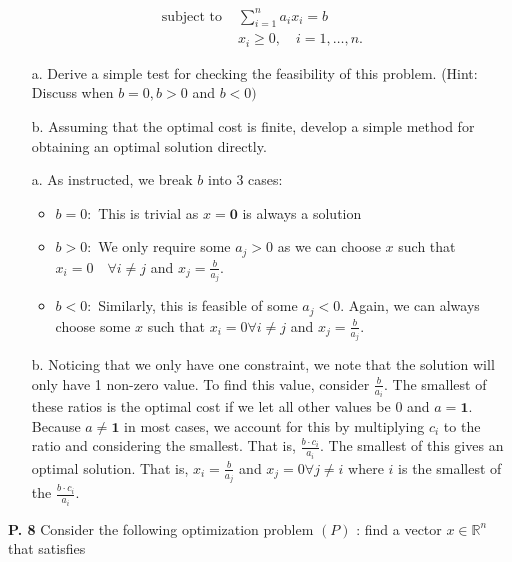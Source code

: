\documentclass{article}
\begin{document}
\begin{jacklist}
\begin{framed}
\[\begin{aligned}
            \text { subject to } & \sum_{i=1}^{n} a_{i} x_{i}=b \\
            & x_{i} \geq 0, \quad i=1, \ldots, n .
        \end{aligned}
    \] 
    \begin{itemize}
        \item [a.] Derive a simple test for checking the feasibility of this problem. (Hint: Discuss when $b=0, b>0$ and $b<0)$ 
        \item [b.] Assuming that the optimal cost is finite, develop a simple method for obtaining an optimal solution directly.
    \end{itemize}
    \end{framed}
    \begin{itemize}
        \item [a.] As instructed, we break $b$ into 3 cases: \\
            \begin{itemize}
                \item $b = 0:$ This is trivial as $x = \textbf{0}$ is always a solution 
                \item $b > 0:$ We only require some $a_j > 0$ as we can choose $x$ such that $x_i = 0 \quad \forall i \neq j$ and 
                    $x_j = \frac{b}{a_j}$. 
                \item $b < 0:$ Similarly, this is feasible of some $a_j < 0$. Again, we can always choose some $x$ such that
                    $x_i = 0 \forall i \neq j$ and $x_j = \frac{b}{a_j}$. 
            \end{itemize}
        \item [b.] Noticing that we only have one constraint, we note that the solution will only have 1 non-zero value. To 
            find this value, consider $ \frac{b}{a_i}$. The smallest of these ratios is the optimal cost if we let all other values
            be 0 and $a = \textbf{1}$. Because $a \neq \textbf{1}$ in most cases, we account for this by multiplying $c_i$ to the ratio 
            and considering the smallest. That is, $ \frac{b \cdot c_i}{a_i}$. The smallest of this gives an optimal solution. That is, 
            $x_i = \frac{b}{a_j}$ and $x_j = 0 \forall j \neq i$ where $i$ is the smallest of the $ \frac{b \cdot c_i}{a_i}$. 
    \end{itemize}
\newpage
    \begin{framed} 
    \item [\textbf{P. 8}] Consider the following optimization problem $(P)$ : find a vector $x \in \mathbb{R}^{n}$ that satisfies 

\end{framed}
\end{jacklist}
\end{document}
